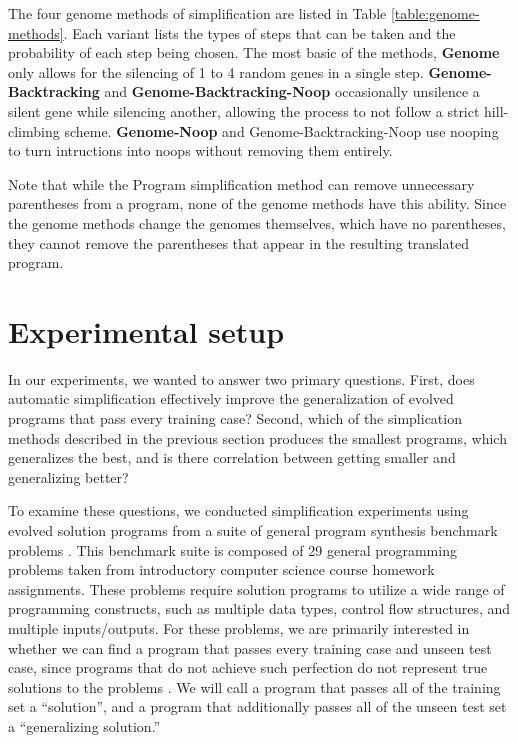 The four genome methods of simplification are listed in Table \ref{table:genome-methods}. Each variant lists the types of steps that can be taken and the probability of each step being chosen. The most basic of the methods, \textbf{Genome} only allows for the silencing of 1 to 4 random genes in a single step. \textbf{Genome-Backtracking} and \textbf{Genome-Backtracking-Noop} occasionally unsilence a silent gene while silencing another, allowing the process to not follow a strict hill-climbing scheme.  \textbf{Genome-Noop} and Genome-Backtracking-Noop use nooping to turn intructions into noops without removing them entirely.

Note that while the Program simplification method can remove unnecessary parentheses from a program, none of the genome methods have this ability. Since the genome methods change the genomes themselves, which have no parentheses, they cannot remove the parentheses that appear in the resulting translated program.


\section{Experimental setup}
\label{sec:setup}

In our experiments, we wanted to answer two primary questions. First, does automatic simplification effectively improve the generalization of evolved programs that pass every training case? Second, which of the simplication methods described in the previous section produces the smallest programs, which generalizes the best, and is there correlation between getting smaller and generalizing better?

To examine these questions, we conducted simplification experiments using evolved solution programs from a suite of general program synthesis benchmark problems \cite{Helmuth:2015:GECCO}. This benchmark suite is composed of 29 general programming problems taken from introductory computer science course homework assignments. These problems require solution programs to utilize a wide range of programming constructs, such as multiple data types, control flow structures, and multiple inputs/outputs. For these problems, we are primarily interested in whether we can find a program that passes every training case and unseen test case, since programs that do not achieve such perfection do not represent true solutions to the problems \cite{Helmuth:2015:GECCO}. We will call a program that passes all of the training set a ``solution'', and a program that additionally passes all of the unseen test set a ``generalizing solution.''

